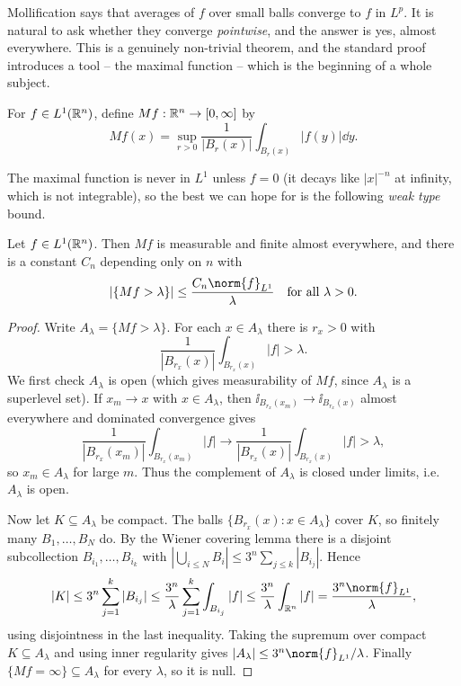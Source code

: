 \documentclass[a4paper]{scrartcl}
\begin{document}
Mollification says that averages of $f$ over small balls converge to $f$ in $L^p$. It is natural to ask whether they converge \emph{pointwise}, and the answer is yes, almost everywhere. This is a genuinely non-trivial theorem, and the standard proof introduces a tool -- the maximal function -- which is the beginning of a whole subject.

\begin{definition}
	For $f \in L^1(\mathbb{R}^n)$, define $Mf : \mathbb{R}^n \to [0,\infty]$ by
	$$Mf(x) = \sup_{r > 0} \frac{1}{|B_r(x)|} \int_{B_r(x)} |f(y)| \dd y.$$
\end{definition}

The maximal function is never in $L^1$ unless $f = 0$ (it decays like $|x|^{-n}$ at infinity, which is not integrable), so the best we can hope for is the following \emph{weak type} bound.

\begin{lemma}\label{aof-lem:maximal}
	Let $f \in L^1(\mathbb{R}^n)$. Then $Mf$ is measurable and finite almost everywhere, and there is a constant $C_n$ depending only on $n$ with
	$$\left| \{ Mf > \lambda\}\right| \le \frac{C_n \norm{f}_{L^1}}{\lambda} \quad \text{for all } \lambda > 0.$$
\end{lemma}

\begin{proof}
	Write $A_\lambda = \{Mf > \lambda\}$. For each $x \in A_\lambda$ there is $r_x > 0$ with
	$$\frac{1}{|B_{r_x}(x)|}\int_{B_{r_x}(x)} |f| > \lambda.$$
	We first check $A_\lambda$ is open (which gives measurability of $Mf$, since $A_\lambda$ is a superlevel set). If $x_m \to x$ with $x \in A_\lambda$, then $\ii_{B_{r_x}(x_m)} \to \ii_{B_{r_x}(x)}$ almost everywhere and dominated convergence gives
	$$\frac{1}{|B_{r_x}(x_m)|}\int_{B_{r_x}(x_m)} |f| \longrightarrow \frac{1}{|B_{r_x}(x)|}\int_{B_{r_x}(x)}|f| > \lambda,$$
	so $x_m \in A_\lambda$ for large $m$. Thus the complement of $A_\lambda$ is closed under limits, i.e.\ $A_\lambda$ is open.

	Now let $K \subseteq A_\lambda$ be compact. The balls $\{B_{r_x}(x) : x \in A_\lambda\}$ cover $K$, so finitely many $B_1, \dots, B_N$ do. By the Wiener covering lemma there is a disjoint subcollection $B_{i_1}, \dots, B_{i_k}$ with $\left| \bigcup_{i \le N} B_i \right| \le 3^n \sum_{j \le k} |B_{i_j}|$. Hence
	$$|K| \le 3^n \sum_{j=1}^k |B_{i_j}| \le \frac{3^n}{\lambda}\sum_{j=1}^k \int_{B_{i_j}}|f| \le \frac{3^n}{\lambda}\int_{\R^n}|f| = \frac{3^n \norm{f}_{L^1}}{\lambda},$$
	using disjointness in the last inequality. Taking the supremum over compact $K \subseteq A_\lambda$ and using inner regularity gives $|A_\lambda| \le 3^n \norm{f}_{L^1}/\lambda$. Finally $\{Mf = \infty\} \subseteq A_\lambda$ for every $\lambda$, so it is null.
\end{proof}
\end{document}
